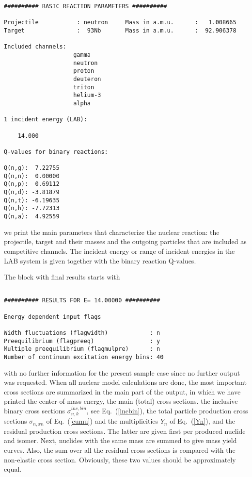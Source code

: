 \begin{samplecase}
{\begin{verbatim}
########## BASIC REACTION PARAMETERS ##########
 
Projectile           : neutron     Mass in a.m.u.      :   1.008665
Target               :  93Nb       Mass in a.m.u.      :  92.906378
 
Included channels:
                    gamma
                    neutron
                    proton
                    deuteron
                    triton
                    helium-3
                    alpha
 
1 incident energy (LAB):
 
    14.000
 
Q-values for binary reactions:
 
Q(n,g):  7.22755
Q(n,n):  0.00000
Q(n,p):  0.69112
Q(n,d): -3.81879
Q(n,t): -6.19635
Q(n,h): -7.72313    
Q(n,a):  4.92559
\end{verbatim} } \renewcommand{\baselinestretch}{1.07}\small\normalsize
\noindent
we print the main parameters that characterize the nuclear 
reaction: the projectile, target and their masses and the outgoing particles 
that are included as competitive channels. The incident energy or range of 
incident energies in the LAB system is given together with the binary reaction
Q-values.

The block with final results starts with

{\small \begin{verbatim}

########## RESULTS FOR E= 14.00000 ##########
 
Energy dependent input flags
 
Width fluctuations (flagwidth)            : n
Preequilibrium (flagpreeq)                : y
Multiple preequilibrium (flagmulpre)      : n
Number of continuum excitation energy bins: 40
\end{verbatim} } \renewcommand{\baselinestretch}{1.07}\small\normalsize
\noindent
with no further information for the present sample case since no further output 
was requested.
When all nuclear model calculations are done, the most important cross sections 
are summarized in the main part of the output,
in which we have printed the center-of-mass energy, the main (total) cross 
sections.
the inclusive binary cross sections $\sigma^{inc,bin}_{n,k}$, see 
Eq.~(\ref{incbin}), the total particle production cross sections 
$\sigma_{n,xn}$ of Eq.~(\ref{cumu}) and the multiplicities $Y_{n}$ of
Eq.~(\ref{Yn}),
and the residual production cross sections. The latter are given first
per produced nuclide and isomer. Next, nuclides with the same mass are summed 
to give mass yield curves. Also, the sum over all the residual cross sections
is compared with the non-elastic cross section. Obviously, these two values
should be approximately equal.


\end{samplecase}
